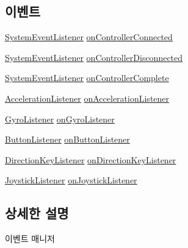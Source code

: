 \subsection*{이벤트}
\begin{DoxyCompactItemize}
\item 
\hyperlink{class_event_manager_a65e017fcb7c22959f09becc40ad3bc2d}{System\+Event\+Listener} \hyperlink{class_event_manager_a1982ee974be3949930955adbf2b69416}{on\+Controller\+Connected}
\item 
\hyperlink{class_event_manager_a65e017fcb7c22959f09becc40ad3bc2d}{System\+Event\+Listener} \hyperlink{class_event_manager_a8f4ec7cfc6f0ca0d4a5872997b359861}{on\+Controller\+Disconnected}
\item 
\hyperlink{class_event_manager_a65e017fcb7c22959f09becc40ad3bc2d}{System\+Event\+Listener} \hyperlink{class_event_manager_af12f0caee161b1b2222cfd13cd957750}{on\+Controller\+Complete}
\item 
\hyperlink{class_event_manager_ac459bcb4ba4f140243e271628f8d366c}{Acceleration\+Listener} \hyperlink{class_event_manager_a653a885d332bd10bf53a1f8e6a8c36cd}{on\+Acceleration\+Listener}
\item 
\hyperlink{class_event_manager_a4ed9f5be26f2015a5cc107257f02eff8}{Gyro\+Listener} \hyperlink{class_event_manager_a31f1da96e98896421b0026df5ce01623}{on\+Gyro\+Listener}
\item 
\hyperlink{class_event_manager_ae17715b9a94a50d9a8e1f29580af7c16}{Button\+Listener} \hyperlink{class_event_manager_a6f4d5e2ed1262c99f3295743878ba681}{on\+Button\+Listener}
\item 
\hyperlink{class_event_manager_a3bcc7e1ecc58c1625fb107ce4fe6feaa}{Direction\+Key\+Listener} \hyperlink{class_event_manager_aabcdea295255f84519ce6c7ef7026b64}{on\+Direction\+Key\+Listener}
\item 
\hyperlink{class_event_manager_ad470a4c2e411d814dd480043332f2a70}{Joystick\+Listener} \hyperlink{class_event_manager_ab148217093b03a8cd7c962a11195c83a}{on\+Joystick\+Listener}
\end{DoxyCompactItemize}


\subsection{상세한 설명}
이벤트 매니저

